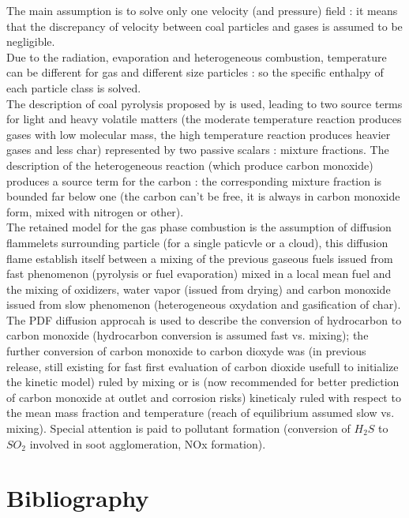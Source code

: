 The main assumption is to solve only one velocity (and pressure) field : it
means that the discrepancy of velocity between coal particles and
gases is assumed to be negligible.\\
Due to the radiation, evaporation and heterogeneous combustion, temperature can
be different for gas and different size particles : so the specific enthalpy of
each particle class is solved.\\
The description of coal pyrolysis proposed by \cite{4} is used, leading to two
source terms for light and heavy volatile matters (the moderate temperature
reaction produces gases with low molecular mass, the high temperature reaction
produces heavier gases and less char) represented by two passive scalars :
mixture fractions.  The description of the heterogeneous reaction (which produce
carbon monoxide) produces a source term for the carbon : the corresponding
mixture fraction is bounded far below one (the carbon can't be free, it is
always in carbon monoxide form, mixed with nitrogen or other).\\
The retained model for the gas phase combustion is the assumption of diffusion
flammelets surrounding particle (for a single paticvle or a cloud), this
diffusion flame establish itself between a mixing of the previous gaseous fuels
issued from fast phenomenon (pyrolysis or fuel evaporation) mixed in a local
mean fuel and the mixing of oxidizers, water vapor (issued from drying) and
carbon monoxide issued from slow phenomenon (heterogeneous oxydation and
gasification of char). The PDF diffusion approcah is used to describe the
conversion of hydrocarbon to carbon monoxide (hydrocarbon conversion is assumed
fast vs. mixing); the further conversion of carbon monoxide to carbon dioxyde
was (in previous release, still existing for fast first evaluation of carbon
dioxide usefull to initialize the kinetic model) ruled by mixing or is (now
recommended for better prediction of carbon monoxide at outlet and corrosion
risks) kineticaly ruled with respect to the mean mass fraction and temperature
(reach of equilibrium assumed slow vs. mixing). Special attention is paid to
pollutant formation (conversion of $H_{2}S$ to $SO_{2}$ involved in soot
agglomeration, NOx formation).

\section{Bibliography}

